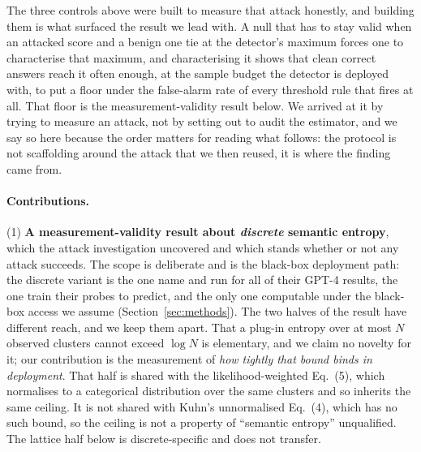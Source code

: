 The three controls above were built to measure that attack honestly, and building them is
what surfaced the result we lead with. A null that has to stay valid when an attacked score
and a benign one tie at the detector's maximum forces one to characterise that maximum, and
characterising it shows that clean correct answers reach it often enough, at the sample budget
the detector is deployed with, to put a floor under the false-alarm rate of every threshold
rule that fires at all. That floor is the measurement-validity result below. We arrived at it
by trying to measure an attack, not by setting out to audit the estimator, and we say so here
because the order matters for reading what follows: the protocol is not scaffolding around the
attack that we then reused, it is where the finding came from.

\paragraph{Contributions.}
(1) \textbf{A measurement-validity result about \emph{discrete} semantic entropy}, which the
attack investigation uncovered and which stands whether or not any attack succeeds. The scope
is deliberate and is the black-box deployment path:
the discrete variant is the one \citet{farquhar2024detecting} name and run for all of their
GPT-4 results, the one \citet{kossen2024seps} train their probes to predict, and the only one
computable under the black-box access we assume (Section~\ref{sec:methods}). The two halves of
the result have different reach, and we keep them apart. That a plug-in entropy over at most
$N$ observed clusters cannot exceed $\log N$ is elementary, and we claim no novelty for it;
our contribution is the measurement of \emph{how tightly that bound binds in deployment}.
That half is shared with the likelihood-weighted Eq.~(5), which normalises to a categorical
distribution over the same clusters and so inherits the same ceiling. It is not shared with
Kuhn's unnormalised Eq.~(4), which has no such bound, so the ceiling is not a property of
``semantic entropy'' unqualified. The lattice half below is discrete-specific and does not
transfer.


